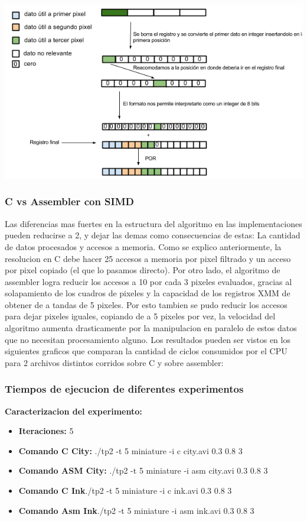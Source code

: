 \includegraphics[scale=0.5]{imagenes/reacomodamiento.png}

\subsubsection{C vs Assembler con SIMD}

Las diferencias mas fuertes en la estructura del algoritmo en las implementaciones pueden reducirse a 2, y dejar las demas como consecuencias de estas: La cantidad de datos procesados y accesos a memoria. Como se explico anteriormente, la resolucion en C debe hacer 25 accesos a memoria por pixel filtrado y un acceso por pixel copiado (el que lo pasamos directo). Por otro lado, el algoritmo de assembler logra reducir los accesos a 10 por cada 3 pixeles evaluados, gracias al solapamiento de los cuadros de pixeles y la capacidad de los registros XMM de obtener de a tandas de 5 pixeles. Por esto tambien se pudo reducir los accesos para dejar pixeles iguales, copiando de a 5 pixeles por vez, la velocidad del algoritmo aumenta drasticamente por la manipulacion en paralelo de estos datos que no necesitan procesamiento alguno. Los resultados pueden ser vistos en los siguientes graficos que comparan la cantidad de ciclos consumidos por el CPU para 2 archivos distintos corridos sobre C y sobre assembler:


\subsubsection{Tiempos de ejecucion de diferentes experimentos}

\par
\bigskip
\textbf{Caracterizacion del experimento: }
\begin{itemize}
    \item \textbf{Iteraciones: } 5
    \item \textbf{Comando C City: }  ./tp2 -t 5 miniature -i c city.avi 0.3 0.8 3
    \item \textbf{Comando ASM City: }  ./tp2 -t 5 miniature -i asm city.avi 0.3 0.8 3
    \item \textbf{Comando C Ink}./tp2 -t 5 miniature -i c ink.avi 0.3 0.8 3
    \item \textbf{Comando Asm Ink}./tp2 -t 5 miniature -i asm ink.avi 0.3 0.8 3
\end{itemize}
\par

